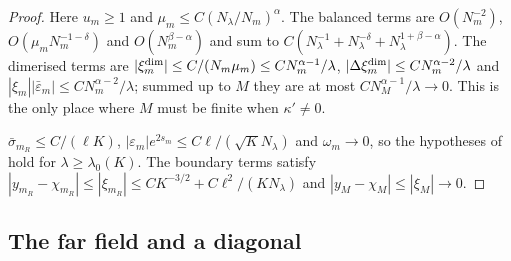 \begin{proof}
 Here $u_m\ge1$ and
$\mu_m\le C(N_\lambda/N_m)^\alpha$. The balanced terms are $O(N_m^{-2})$, $O(\mu_mN_m^{-1-\delta})$
and $O(N_m^{\beta-\alpha})$ and sum to $C(N_\lambda^{-1}+N_\lambda^{-\delta}+N_\lambda^{1+\beta-\alpha})$.
The dimerised terms are $|\xi^{\rm dim}_m|\le C/(N_m\mu_m)\le CN_m^{\alpha-1}/\lambda$,
$|\Delta\xi^{\rm dim}_m|\le CN_m^{\alpha-2}/\lambda$ and $|\xi_m||\bar\varepsilon_m|\le CN_m^{\alpha-2}/\lambda$;
summed up to $M$ they are at most $CN_M^{\alpha-1}/\lambda\to0$. This is the only place
where $M$ must be finite when $\kappa'\ne0$.

 $\bar\sigma_{m_R}\le C/(\ell K)$,
$|\varepsilon_m|e^{2s_m}\le C\ell/(\sqrt KN_\lambda)$ and $\omega_m\to0$, so the hypotheses of
 hold for $\lambda\ge\lambda_0(K)$. The boundary terms satisfy
$|y_{m_R}-\chi_{m_R}|\le|\xi_{m_R}|\le CK^{-3/2}+C\ell^2/(KN_\lambda)$ and
$|y_M-\chi_M|\le|\xi_M|\to0$.
\end{proof}

\subsection{The far field and a diagonal}

